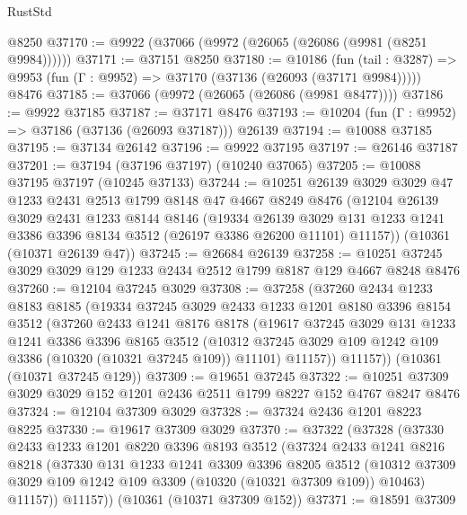 \begin{lexlean}{RustStd}
\begin{coremodule}
    @8250
@37170 := @9922 (@37066 (@9972 (@26065 (@26086 (@9981 (@8251 @9984))))))
@37171 := @37151 @8250
@37180 := @10186
    (fun (tail : @3287) => @9953 (fun (Γ : @9952) => @37170 (@37136 (@26093 (@37171 @9984)))))
    @8476
@37185 := @37066 (@9972 (@26065 (@26086 (@9981 @8477))))
@37186 := @9922 @37185
@37187 := @37171 @8476
@37193 := @10204 (fun (Γ : @9952) => @37186 (@37136 (@26093 @37187))) @26139
@37194 := @10088 @37185
@37195 := @37134 @26142
@37196 := @9922 @37195
@37197 := @26146 @37187
@37201 := @37194 (@37196 @37197) (@10240 @37065)
@37205 := @10088 @37195 @37197 (@10245 @37133)
@37244 := @10251
    @26139
    @3029
    @3029
    @47
    @1233
    @2431
    @2513
    @1799
    @8148
    @47
    @4667
    @8249
    @8476
    (@12104
      @26139
      @3029
      @2431
      @1233
      @8144
      @8146
      (@19334
        @26139
        @3029
        @131
        @1233
        @1241
        @3386
        @3396
        @8134
        @3512
        (@26197 @3386 @26200 @11101)
        @11157))
    (@10361 (@10371 @26139 @47))
@37245 := @26684 @26139
@37258 := @10251 @37245 @3029 @3029 @129 @1233 @2434 @2512 @1799 @8187 @129 @4667 @8248 @8476
@37260 := @12104 @37245 @3029
@37308 := @37258
    (@37260
      @2434
      @1233
      @8183
      @8185
      (@19334
        @37245
        @3029
        @2433
        @1233
        @1201
        @8180
        @3396
        @8154
        @3512
        (@37260
          @2433
          @1241
          @8176
          @8178
          (@19617
            @37245
            @3029
            @131
            @1233
            @1241
            @3386
            @3396
            @8165
            @3512
            (@10312 @37245 @3029 @109 @1242 @109 @3386 (@10320 (@10321 @37245 @109)) @11101)
            @11157))
        @11157))
    (@10361 (@10371 @37245 @129))
@37309 := @19651 @37245
@37322 := @10251 @37309 @3029 @3029 @152 @1201 @2436 @2511 @1799 @8227 @152 @4767 @8247 @8476
@37324 := @12104 @37309 @3029
@37328 := @37324 @2436 @1201 @8223 @8225
@37330 := @19617 @37309 @3029
@37370 := @37322
    (@37328
      (@37330
        @2433
        @1233
        @1201
        @8220
        @3396
        @8193
        @3512
        (@37324
          @2433
          @1241
          @8216
          @8218
          (@37330
            @131
            @1233
            @1241
            @3309
            @3396
            @8205
            @3512
            (@10312 @37309 @3029 @109 @1242 @109 @3309 (@10320 (@10321 @37309 @109)) @10463)
            @11157))
        @11157))
    (@10361 (@10371 @37309 @152))
@37371 := @18591 @37309

\end{coremodule}
\end{lexlean}
